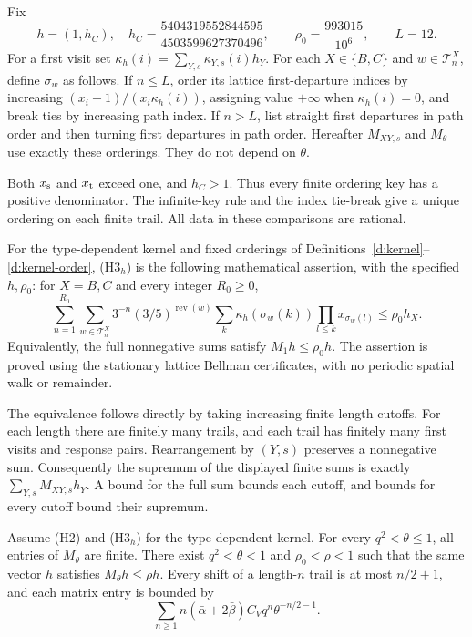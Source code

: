 \begin{definition}\label{d:kernel-order}
Fix
\[
 h=(1,h_C),\quad h_C=\frac{5404319552844595}{4503599627370496},
 \qquad \rho_0=\frac{993015}{10^6},\qquad L=12 .
\]
For a first visit set \(\kappa_h(i)=\sum_{Y,s}\kappa_{Y,s}(i)h_Y\).
For each \(X\in\{B,C\}\) and \(w\in\mathcal T_n^X\), define
\(\sigma_w\) as follows. If \(n\le L\), order its lattice
first-departure indices by increasing
\((x_i-1)/(x_i\kappa_h(i))\), assigning value \(+\infty\) when
\(\kappa_h(i)=0\), and break ties by increasing path index.
If \(n>L\), list straight first departures in path order and
then turning first departures in path order.
Hereafter \(M_{XY,s}\) and \(M_\theta\) use exactly these orderings.
They do not depend on \(\theta\).
\end{definition}

Both \(x_{\rm s}\) and \(x_{\rm t}\) exceed one, and \(h_C>1\).
Thus every finite ordering key has a positive denominator.  The
infinite-key rule and the index tie-break give a unique ordering on
each finite trail.  All data in these comparisons are rational.

\begin{definition}[(H3\(_h\))]\label{h:H3}
For the type-dependent kernel and fixed orderings of
Definitions~\ref{d:kernel}--\ref{d:kernel-order}, (H3\(_h\)) is the
following mathematical assertion, with the specified \(h,\rho_0\):
for \(X=B,C\) and every integer \(R_0\ge0\),
\[
 \sum_{n=1}^{R_0}\sum_{w\in\mathcal T_n^X}
 3^{-n}(3/5)^{\operatorname{rev}(w)}
 \sum_k\kappa_h(\sigma_w(k))\prod_{l\le k}x_{\sigma_w(l)}
       \le\rho_0h_X .
\]
Equivalently, the full nonnegative sums satisfy \(M_1h\le\rho_0h\).
The assertion is proved using the stationary lattice Bellman
certificates, with no periodic spatial walk or remainder.
\end{definition}

The equivalence follows directly by taking increasing finite
length cutoffs.  For each length there are finitely many trails,
and each trail has finitely many first visits and response pairs.
Rearrangement by \((Y,s)\) preserves a nonnegative sum.  Consequently
the supremum of the displayed finite sums is exactly
\(\sum_{Y,s}M_{XY,s}h_Y\).  A bound for the full sum bounds each
cutoff, and bounds for every cutoff bound their supremum.

\begin{lemma}\label{l:Mtheta}
Assume (H2) and (H3\(_h\)) for the type-dependent kernel.
For every \(q^2<\theta\le1\), all entries of \(M_\theta\) are
finite. There exist \(q^2<\theta<1\) and \(\rho_0<\rho<1\)
such that the same vector \(h\) satisfies \(M_\theta h\le\rho h\).
Every shift of a length-\(n\) trail is at most \(n/2+1\), and
each matrix entry is bounded by
\[
 \sum_{n\ge1} n(\bar\alpha+2\bar\beta)
                      C_V q^n\theta^{-n/2-1}.
\]
\end{lemma}

